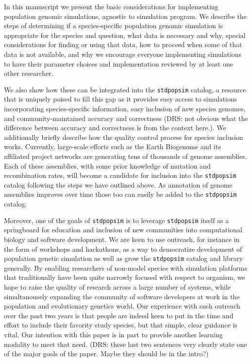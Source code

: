 \documentclass[hidelinks]{article}
\newcommand{\stdpopsim}{\texttt{stdpopsim}\xspace}
\begin{document}
In this manuscript we present the basic considerations for implementing
population genomic simulations, agnostic to simulation program. We
describe the steps of determining if a species-specific population
genomic simulation is appropriate for the species and question, what
data is necessary and why, special considerations for finding or using
that data, how to proceed when some of that data is not available,
and why we encourage everyone implementing simulations to have their
parameter choices and implementation reviewed by at least one other
researcher.

We also show how these can be integrated into the \stdpopsim catalog, a
resource that is uniquely poised to fill this gap as it provides easy
access to simulations incorporating species-specific information,
easy inclusion of new species genomes, and community-maintained accuracy
and correctness (DRS: not obvious what the difference between accuracy
and correctness is from the context here.).
We additionally briefly describe how the quality control 
process for species inclusion works. Currently, large-scale efforts such as the Earth Biogenome
and its affiliated project networks are generating tens of thousands of genome
assemblies. Each of these assemblies, with some prior knowledge of mutation and
recombination rates, will become a candidate for inclusion into the
\stdpopsim catalog following the steps we have outlined above. As
annotation of genome assemblies improves over time those too can easily
be added to the \stdpopsim catalog.

Moreover, one of the goals of \stdpopsim is to leverage \stdpopsim itself
as a springboard for education and inclusion of new communities into
computational biology and software development. We are keen to use
outreach, for instance in the form of workshops and hackathons, as a way
to democratize development of population genetic simulation as well as
grow the \stdpopsim catalog and library generally. By enabling
researchers of non-model species with simulation platforms that
traditionally have been quite narrowly focused with respect to organism,
we hope to raise the quality of research across a large number of
systems, while simultanousely expanding the community of software
developers at work in the population and evolutionary genetics world.
Our experience with such outreach over the past two years is that people
are indeed keen to put in the time and effort to include their favority
study species, but that simple, clear guidance is vital. Our
intention with this paper is in part to provide another learning
modality to meet that need. (DRS: these last two sentences very
clearly state one of the major goals of the paper. Maybe they should be
in the intro?)
\end{document}
